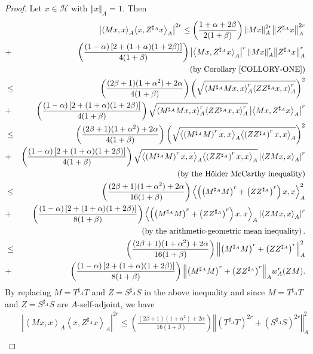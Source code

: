 \documentclass{article}
\newcommand{\bra}[1]{\left(#1\right)}
\newcommand{\sbra}[1]{\left[#1\right]}
\newcommand{\seqA}[1]{{\left<#1\right>}_{A}}
\newcommand{\normA}[1]{{\left\Vert#1\right\Vert}_{A}}
\newcommand{\abs}[1]{\left\vert#1\right\vert}
\newcommand {\Sa}{S^{\sharp_{A}}}
\newcommand {\Za}{Z^{\sharp_{A}}}
\newcommand {\Ma}{M^{\sharp_{A}}}
\newcommand {\h}{\mathcal{H}}
\newcommand {\Ta}{T^{\sharp_{A}}}
\begin{document}
\begin{proof} Let $x\in\h$ with $\normA{x}=1$. Then
\begin{eqnarray*}
 &&\abs{\seqA{Mx,x}\seqA{x,\Za x}}^{2r}\leq \bra{\frac{1+\alpha+2\beta}{2(1+\beta)}}\normA{Mx}^{2r}\normA{\Za x}^{2r}\\
 &+&\bra{\frac{\bra{1-\alpha}\sbra{2+(1+\alpha)(1+2\beta)}}{4(1+\beta)}}\abs{\seqA{Mx,\Za x}}^{r}\normA{Mx}^r\normA{\Za x}^r \\
   &&\bra{\mbox{by Corollary \ref{COLLORY-ONE}}}\\
   &\leq&\bra{\frac{(2\beta+1)(1+\alpha^2)+2\alpha}{4(1+\beta)}}\bra{\sqrt{\seqA{\Ma Mx,x}^{r}\seqA{Z\Za x,x}^{r}}}^{2}\\
   &+&\bra{\frac{\bra{1-\alpha}\sbra{2+(1+\alpha)(1+2\beta)}}{4(1+\beta)}}\sqrt{\seqA{\Ma Mx,x}^{r}\seqA{Z\Za x,x}^{r}}\abs{\seqA{Mx,\Za x}}^{r}\\
   &\leq&\bra{\frac{(2\beta+1)(1+\alpha^2)+2\alpha}{4(1+\beta)}}\bra{\sqrt{\seqA{\bra{\Ma M}^{r}x,x}\seqA{\bra{Z\Za}^{r} x,x}}}^{2}\\
   &+&\bra{\frac{\bra{1-\alpha}\sbra{2+(1+\alpha)(1+2\beta)}}{4(1+\beta)}}\sqrt{\seqA{\bra{\Ma M}^{r}x,x}\seqA{\bra{Z\Za}^{r} x,x}}\abs{\seqA{ZMx, x}}^{r}\\
   &&\bra{\mbox{by the H\"older McCarthy inequality}}\\
   &\leq& \bra{\frac{(2\beta+1)(1+\alpha^2)+2\alpha}{16(1+\beta)}}\seqA{\bra{\bra{\Ma M}^{r}+\bra{Z\Za}^{r}}x,x}^2\\
   &+&\bra{\frac{\bra{1-\alpha}\sbra{2+(1+\alpha)(1+2\beta)}}{8(1+\beta)}}\seqA{\bra{\bra{\Ma M}^{r}+\bra{Z\Za}^{r}}x,x}\abs{\seqA{ZMx, x}}^{r}\\
   &&\bra{\mbox{by the arithmetic-geometric mean inequality}}.\\
   &\leq& \bra{\frac{(2\beta+1)(1+\alpha^2)+2\alpha}{16(1+\beta)}}\normA{\bra{\Ma M}^{r}+\bra{Z\Za}^{r}}^2\\
   &+& \bra{\frac{\bra{1-\alpha}\sbra{2+(1+\alpha)(1+2\beta)}}{8(1+\beta)}}\normA{\bra{\Ma M}^{r}+\bra{Z\Za}^{r}}w_A^{r}(ZM).
\end{eqnarray*}
By replacing $M=\Ta T$ and $Z=\Sa S$ in the above inequality and since $M=\Ta T$ and $Z=\Sa S$ are $A$-self-adjoint, we have
\begin{eqnarray}\label{MK1}
 &&\abs{\seqA{Mx,x}\seqA{x,\Za x}}^{2r}\leq  \bra{\frac{(2\beta+1)(1+\alpha^2)+2\alpha}{16(1+\beta)}}\normA{\bra{\Ta T}^{2r}+\bra{\Sa S}^{2r}}^2\nonumber\\

\end{eqnarray}
\end{proof}
\end{document}
